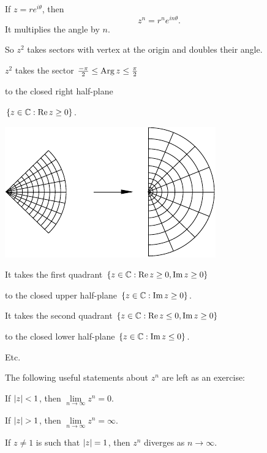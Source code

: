 \documentclass[10pt,aspectratio=169]{beamer}
\begin{document}
\begin{frame}
If $z = re^{i\theta}$, then
\[
z^n = r^n e^{i n\theta} .
\]
It multiplies the angle by $n$.

\medskip
\pause
So $z^2$ takes sectors with vertex at the origin and doubles their angle.

\medskip
\pause

$z^2$ takes the sector
$\frac{-\pi}{2} \leq \operatorname{Arg} z \leq \frac{\pi}{2}$

to the closed right half-plane

$\{ z \in {\mathbb{C}} : \operatorname{Re} z \geq 0 \}$.

\vspace*{-0.7in}
\hspace{3in}%
\includegraphics{../figures/zsqplot}

\pause
\vspace*{-0.1in}
It takes the first quadrant
$\{ z \in {\mathbb{C}} : \operatorname{Re} z \geq 0, \operatorname{Im} z \geq 0 \}$

to the closed upper half-plane $\{ z \in {\mathbb{C}} : \operatorname{Im} z \geq 0 \}$.

\medskip
\pause

It takes the second quadrant
$\{ z \in {\mathbb{C}} : \operatorname{Re} z \leq 0, \operatorname{Im} z \geq 0 \}$

to the closed lower half-plane $\{ z \in {\mathbb{C}} : \operatorname{Im} z \leq 0 \}$.

\medskip
\pause

Etc.
\end{frame}

\begin{frame}
The following useful statements about $z^n$ are left as an exercise:

\medskip
\pause

If $\lvert {z} \rvert<1$, then $\lim\limits_{n\to \infty} z^n = 0$.

\medskip
\pause

If $\lvert {z} \rvert>1$, then $\lim\limits_{n\to \infty} z^n = \infty$.

\medskip
\pause

If $z \not= 1$ is such that $\lvert {z} \rvert=1$, then $z^n$ diverges as $n \to
\infty$.
\end{frame}
\end{document}
